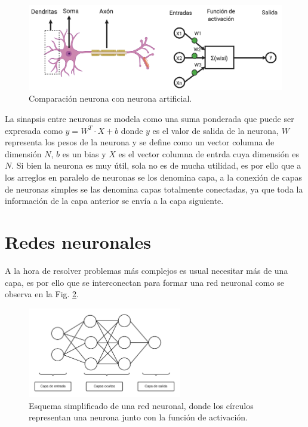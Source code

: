 \begin{figure}[bth]
    \centering
    \includegraphics[width=1\textwidth]{imgs/comparacion-neurona-red.png}
    \caption{Comparación neurona con neurona artificial.}
    \label{fig:comparativa-neuronas}
\end{figure}

La sinapsis entre neuronas se modela como una suma ponderada que puede ser expresada como $y =W^T \cdot X + b$ donde $y$ es el valor de salida de la neurona,
$W$ representa los pesos de la neurona y se define como un vector columna de dimensión $N$, $b$ es un bias y $X$ es el vector columna de entrda cuya dimensión es $N$. Si bien la neurona es muy útil, sola no es de mucha utilidad, es por ello que a los arreglos en paralelo de neuronas se los denomina capa, a la conexión de capas de neuronas simples se las denomina capas totalmente conectadas, ya que toda la información de la capa anterior se envía a la capa siguiente.

\section{Redes neuronales}

A la hora de resolver problemas más complejos es usual necesitar más de una capa, es por ello que se interconectan para formar una red neuronal como se observa en la Fig. \ref{fig:esquema-redes}.

\begin{figure}[bth]
    \centering
    \includegraphics[width=0.6\textwidth]{imgs/Redes-esquema.png}
    \caption{Esquema simplificado de una red neuronal, donde los círculos representan una neurona junto con la función de activación.}
    \label{fig:esquema-redes}
\end{figure}

